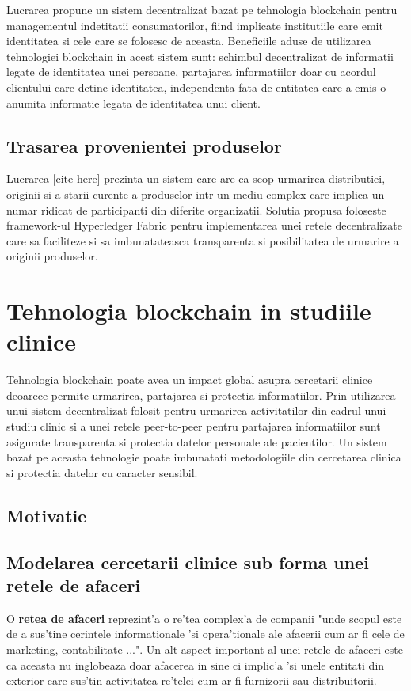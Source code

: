 \documentclass[12pt,a4paper,twoside]{report}
\begin{document}
Lucrarea propune un sistem decentralizat bazat pe tehnologia blockchain pentru managementul indetitatii consumatorilor, fiind implicate institutiile care emit identitatea si cele care se folosesc de aceasta. Beneficiile aduse de utilizarea tehnologiei blockchain in acest sistem sunt: schimbul decentralizat de informatii legate de identitatea unei persoane, partajarea informatiilor doar cu acordul clientului care detine identitatea, independenta fata de entitatea care a emis o anumita informatie legata de identitatea unui client.

\subsection{Trasarea provenientei produselor}

Lucrarea [cite here] prezinta un sistem care are ca scop urmarirea distributiei, originii si a starii curente a produselor intr-un mediu complex care implica un numar ridicat de participanti din diferite organizatii. Solutia propusa foloseste framework-ul Hyperledger Fabric pentru implementarea unei retele decentralizate care sa faciliteze si sa imbunatateasca transparenta si posibilitatea de urmarire a originii produselor.

\section{Tehnologia blockchain in studiile clinice}
Tehnologia blockchain poate avea un impact global asupra cercetarii clinice deoarece permite urmarirea, partajarea si protectia informatiilor. Prin utilizarea unui sistem decentralizat folosit pentru urmarirea activitatilor din cadrul unui studiu clinic si a unei retele peer-to-peer pentru partajarea informatiilor sunt asigurate transparenta si protectia datelor personale ale pacientilor. Un sistem bazat pe aceasta tehnologie poate imbunatati metodologiile din cercetarea clinica si protectia datelor cu caracter sensibil.

\subsection{Motivatie}


\subsection{Modelarea cercetarii clinice sub forma unei retele de afaceri}

	O \textbf{retea de afaceri} reprezint'a o re'tea complex'a de companii "unde scopul este de a sus'tine cerintele informationale 'si opera'tionale ale afacerii cum ar fi cele de marketing, contabilitate ..."\cite{bndef}. Un alt aspect important al unei retele de afaceri este ca aceasta nu inglobeaza doar afacerea in sine ci implic'a 'si unele entitati din exterior care sus'tin activitatea re'telei cum ar fi furnizorii sau distribuitorii. 
	
\end{document}
